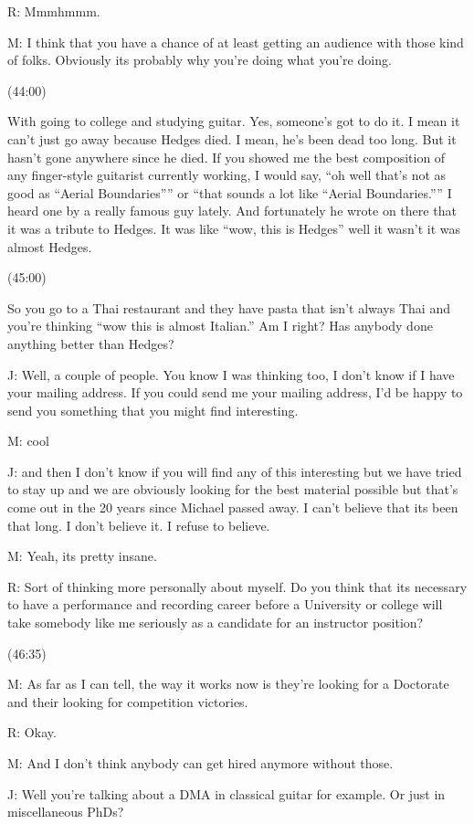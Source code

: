 \documentclass[11pt]{article}
\begin{document}
R: Mmmhmmm.

M: I think that you have a chance of at least getting an audience with those kind of folks. Obviously its probably why you're doing what you're doing. 

(44:00)

With going to college and studying guitar. Yes, someone's got to do it. I mean it can't just go away because Hedges died. I mean, he's been dead too long. But it hasn't gone anywhere since he died. If you showed me the best composition of any finger-style guitarist currently working, I would say, ``oh well that's not as good as ``Aerial Boundaries'''' or ``that sounds a lot like ``Aerial Boundaries.'''' I heard one by a really famous guy lately. And fortunately he wrote on there that it was a tribute to Hedges. It was like ``wow, this is Hedges'' well it wasn't it was almost Hedges. 

(45:00)

So you go to a Thai restaurant and they have pasta that isn't always Thai and you're thinking ``wow this is almost Italian.'' Am I right? Has anybody done anything better than Hedges?

J: Well, a couple of people. You know I was thinking too, I don't know if I have your mailing address. If you could send me your mailing address, I'd be happy to send you something that you might find interesting.

M: cool

J: and then I don't know if you will find any of this interesting but we have tried to stay up and we are obviously looking for the best material possible but that's come out in the 20 years since Michael passed away. I can't believe that its been that long. I don't believe it. I refuse to believe.

M: Yeah, its pretty insane. 

R: Sort of thinking more personally about myself. Do you think that its necessary to have a performance and recording career before a University or college will take somebody like me seriously as a candidate for an instructor position?  

(46:35)

M: As far as I can tell, the way it works now is they're looking for a Doctorate and their looking for competition victories. 

R: Okay.

M: And I don't think anybody can get hired anymore without those.

J: Well you're talking about a DMA in classical guitar for example. Or just in miscellaneous PhDs?
\end{document}
